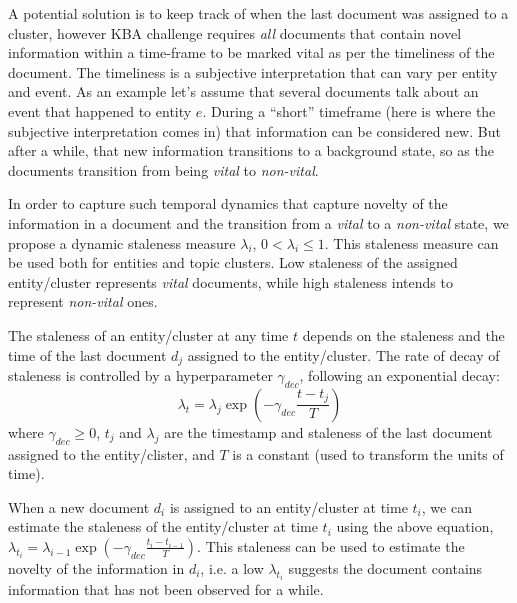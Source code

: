 \documentclass{article}
\begin{document}
A potential solution is to keep track of when the last document was assigned to a cluster, however KBA challenge requires \emph{all} documents that contain novel information within a time-frame to be marked vital as per the timeliness of the document.
The timeliness is a subjective interpretation that can vary per entity and event. 
As an example let's assume that several documents talk about an event that happened to entity $e$. 
During a ``short'' timeframe (here is where the subjective interpretation comes in) that information can be considered new. 
But after a while, that new information transitions to a background state, so as the documents transition from being \emph{vital} to \emph{non-vital}.


In order to capture such temporal dynamics that capture novelty of the information in a document and the transition from a \emph{vital} to a \emph{non-vital} state, we propose a dynamic staleness measure $\lambda_i$, $0 < \lambda_i \leq 1$. 
This staleness measure can be used both for entities and topic clusters.
Low staleness of the assigned entity/cluster represents \emph{vital} documents, while high staleness intends to represent \emph{non-vital} ones.

The staleness of an entity/cluster at any time $t$ depends on the staleness and the time of the last document $d_j$ assigned to the entity/cluster. %
The rate of decay of staleness is controlled by a hyperparameter $\gamma_{dec}$, following an exponential decay:
\begin{equation}
\label{decrease}
\lambda_t = \lambda_{j} \exp{(-\gamma_{dec} \frac{t-t_j}{T})}
\end{equation}
where $\gamma_{dec} \geq 0$, $t_j$ and $\lambda_j$ are the timestamp and staleness of the last document assigned to the entity/clister, and $T$ is a constant (used to transform the units of time). %

When a new document $d_i$ is assigned to an entity/cluster at time $t_i$, we can estimate the staleness of the entity/cluster at time $t_i$ using the above equation, $\lambda_{t_i} = \lambda_{i-1} \exp{(-\gamma_{dec} \frac{t_i-t_{i-1}}{T})}$.
This staleness can be used to estimate the novelty of the information in $d_i$, i.e. a low $\lambda_{t_i}$ suggests the document contains information that has not been observed for a while.
\end{document}

